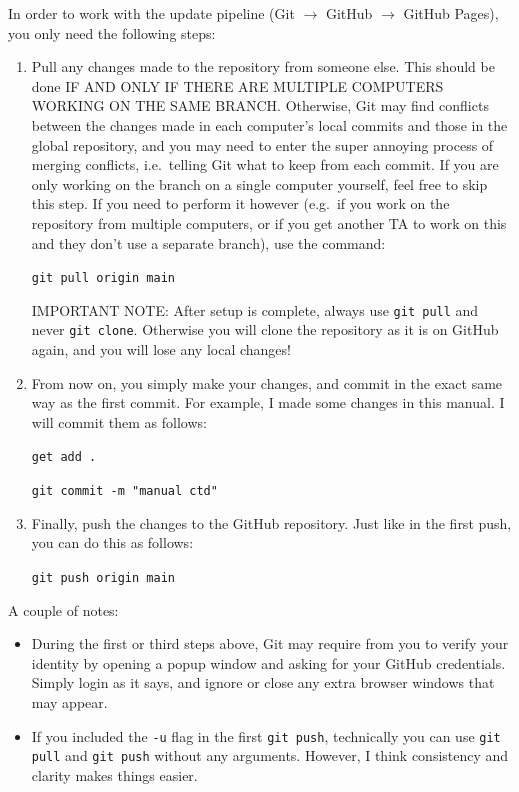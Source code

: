 \documentclass[a4paper,10pt]{article}
\begin{document}
In order to work with the update pipeline (Git $\to$ GitHub $\to$ GitHub Pages), you only need the following steps: 
\begin{enumerate}
    \item Pull any changes made to the repository from someone else. This should be done IF AND ONLY IF THERE ARE MULTIPLE COMPUTERS WORKING ON THE SAME BRANCH. Otherwise, Git may find conflicts between the changes made in each computer's local commits and those in the global repository, and you may need to enter the super annoying process of merging conflicts, i.e.\ telling Git what to keep from each commit. If you are only working on the branch on a single computer yourself, feel free to skip this step. If you need to perform it however (e.g.\ if you work on the repository from multiple computers, or if you get another TA to work on this and they don't use a separate branch), use the command:

    \texttt{git pull origin main}

    IMPORTANT NOTE: After setup is complete, always use \texttt{git pull} and never \texttt{git clone}. Otherwise you will clone the repository as it is on GitHub again, and you will lose any local changes!  

    \item From now on, you simply make your changes, and commit in the exact same way as the first commit. For example, I made some changes in this manual. I will commit them as follows:

    \texttt{get add .}

    \texttt{git commit -m "manual ctd"}

    \item Finally, push the changes to the GitHub repository. Just like in the first push, you can do this as follows:

    \texttt{git push origin main}
\end{enumerate}
A couple of notes:
\begin{itemize}
    \item During the first or third steps above, Git may require from you to verify your identity by opening a popup window and asking for your GitHub credentials. Simply login as it says, and ignore or close any extra browser windows that may appear.
    \item If you included the \texttt{-u} flag in the first \texttt{git push}, technically you can use \texttt{git pull} and \texttt{git push} without any arguments. However, I think consistency and clarity makes things easier.
\end{itemize}
\end{document}
